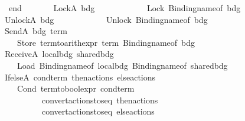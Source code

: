 \begin{isabellebody}
\ \ \ \ \ \ \ \ end\isanewline
\ \ \ \ \ \ {\isacharbar}{\kern0pt}\ LockA\ bdg\ {\isacharequal}{\kern0pt}{\isachargreater}{\kern0pt}\ \isanewline
\ \ \ \ \ \ \ \ \ \ Lock\ {\isacharparenleft}{\kern0pt}Binding{\isachardot}{\kern0pt}name{\isacharunderscore}{\kern0pt}of\ bdg{\isacharparenright}{\kern0pt}\isanewline
\ \ \ \ \ \ {\isacharbar}{\kern0pt}\ UnlockA\ bdg\ {\isacharequal}{\kern0pt}{\isachargreater}{\kern0pt}\ \isanewline
\ \ \ \ \ \ \ \ \ \ Unlock\ {\isacharparenleft}{\kern0pt}Binding{\isachardot}{\kern0pt}name{\isacharunderscore}{\kern0pt}of\ bdg{\isacharparenright}{\kern0pt}\isanewline
\ \ \ \ \ \ {\isacharbar}{\kern0pt}\ SendA\ {\isacharparenleft}{\kern0pt}bdg{\isacharcomma}{\kern0pt}\ term{\isacharparenright}{\kern0pt}\ {\isacharequal}{\kern0pt}{\isachargreater}{\kern0pt}\ \isanewline
\ \ \ \ \ \ \ \ \ \ Store\ {\isacharparenleft}{\kern0pt}term{\isacharunderscore}{\kern0pt}to{\isacharunderscore}{\kern0pt}arith{\isacharunderscore}{\kern0pt}expr\ term{\isacharcomma}{\kern0pt}\ Binding{\isachardot}{\kern0pt}name{\isacharunderscore}{\kern0pt}of\ bdg{\isacharparenright}{\kern0pt}\isanewline
\ \ \ \ \ \ {\isacharbar}{\kern0pt}\ ReceiveA\ {\isacharparenleft}{\kern0pt}local{\isacharunderscore}{\kern0pt}bdg{\isacharcomma}{\kern0pt}\ shared{\isacharunderscore}{\kern0pt}bdg{\isacharparenright}{\kern0pt}\ {\isacharequal}{\kern0pt}{\isachargreater}{\kern0pt}\ \isanewline
\ \ \ \ \ \ \ \ \ \ Load\ {\isacharparenleft}{\kern0pt}Binding{\isachardot}{\kern0pt}name{\isacharunderscore}{\kern0pt}of\ local{\isacharunderscore}{\kern0pt}bdg{\isacharcomma}{\kern0pt}\ Binding{\isachardot}{\kern0pt}name{\isacharunderscore}{\kern0pt}of\ shared{\isacharunderscore}{\kern0pt}bdg{\isacharparenright}{\kern0pt}\isanewline
\ \ \ \ \ \ {\isacharbar}{\kern0pt}\ IfelseA\ {\isacharparenleft}{\kern0pt}{\isacharparenleft}{\kern0pt}cond{\isacharunderscore}{\kern0pt}term{\isacharcomma}{\kern0pt}\ then{\isacharunderscore}{\kern0pt}actions{\isacharparenright}{\kern0pt}{\isacharcomma}{\kern0pt}\ else{\isacharunderscore}{\kern0pt}actions{\isacharparenright}{\kern0pt}\ {\isacharequal}{\kern0pt}{\isachargreater}{\kern0pt}\isanewline
\ \ \ \ \ \ \ \ \ \ Cond\ {\isacharparenleft}{\kern0pt}term{\isacharunderscore}{\kern0pt}to{\isacharunderscore}{\kern0pt}bool{\isacharunderscore}{\kern0pt}expr\ cond{\isacharunderscore}{\kern0pt}term{\isacharcomma}{\kern0pt}\isanewline
\ \ \ \ \ \ \ \ \ \ \ \ \ \ \ \ convert{\isacharunderscore}{\kern0pt}actions{\isacharunderscore}{\kern0pt}to{\isacharunderscore}{\kern0pt}seq\ then{\isacharunderscore}{\kern0pt}actions{\isacharcomma}{\kern0pt}\isanewline
\ \ \ \ \ \ \ \ \ \ \ \ \ \ \ \ convert{\isacharunderscore}{\kern0pt}actions{\isacharunderscore}{\kern0pt}to{\isacharunderscore}{\kern0pt}seq\ else{\isacharunderscore}{\kern0pt}actions{\isacharparenright}{\kern0pt}\isanewline

\end{isabellebody}
